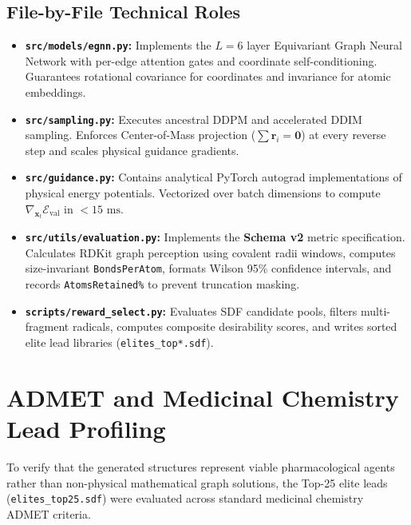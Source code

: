 \documentclass[11pt, a4paper]{article}
\begin{document}
\subsection{File-by-File Technical Roles}
\begin{itemize}
    \item \textbf{\texttt{src/models/egnn.py}:} Implements the $L=6$ layer Equivariant Graph Neural Network with per-edge attention gates and coordinate self-conditioning. Guarantees rotational covariance for coordinates and invariance for atomic embeddings.
    \item \textbf{\texttt{src/sampling.py}:} Executes ancestral DDPM and accelerated DDIM sampling. Enforces Center-of-Mass projection ($\sum \bm{r}_i = \bm{0}$) at every reverse step and scales physical guidance gradients.
    \item \textbf{\texttt{src/guidance.py}:} Contains analytical PyTorch autograd implementations of physical energy potentials. Vectorized over batch dimensions to compute $\nabla_{\bm{x}_t} \mathcal{E}_{\text{val}}$ in $<15\text{ ms}$.
    \item \textbf{\texttt{src/utils/evaluation.py}:} Implements the \textbf{Schema v2} metric specification. Calculates RDKit graph perception using covalent radii windows, computes size-invariant \texttt{BondsPerAtom}, formats Wilson 95\% confidence intervals, and records \texttt{AtomsRetained\%} to prevent truncation masking.
    \item \textbf{\texttt{scripts/reward\_select.py}:} Evaluates SDF candidate pools, filters multi-fragment radicals, computes composite desirability scores, and writes sorted elite lead libraries (\texttt{elites\_top*.sdf}).
\end{itemize}

\section{ADMET and Medicinal Chemistry Lead Profiling}

To verify that the generated structures represent viable pharmacological agents rather than non-physical mathematical graph solutions, the Top-25 elite leads (\texttt{elites\_top25.sdf}) were evaluated across standard medicinal chemistry ADMET criteria.
\end{document}
